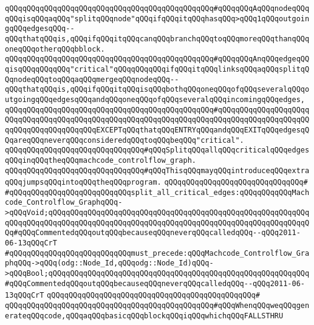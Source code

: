 \verb|qQQqqQQqqQQqqQQqqQQqqQQqqQQqqQQqqQQqqQQqqQQqqQQq#qQQqqQQqAqQQqnodeqQQqqQQqisqQQqaqQQq"splitqQQqnode"qQQqifqQQqitqQQqhasqQQq>qQQq1qQQqoutgoingqQQqedgesqQQq--qQQqthatqQQqis,qQQqifqQQqitqQQqcanqQQqbranchqQQqtoqQQqmoreqQQqthanqQQqoneqQQqotherqQQqbblock.|\newline
\verb|qQQqqQQqqQQqqQQqqQQqqQQqqQQqqQQqqQQqqQQqqQQqqQQq#qQQqqQQqAnqQQqedgeqQQqisqQQqqQQqqQQq"critical"qQQqqQQqqQQqifqQQqitqQQqlinksqQQqaqQQqsplitqQQqnodeqQQqtoqQQqaqQQqmergeqQQqnodeqQQq--qQQqthatqQQqis,qQQqifqQQqitqQQqisqQQqbothqQQqoneqQQqofqQQqseveralqQQqoutgoingqQQqedgesqQQqandqQQqoneqQQqofqQQqseveralqQQqincomingqQQqedges,|\newline
\verb|qQQqqQQqqQQqqQQqqQQqqQQqqQQqqQQqqQQqqQQqqQQqqQQq#qQQqqQQqqQQqqQQqqQQqqQQqqQQqqQQqqQQqqQQqqQQqqQQqqQQqqQQqqQQqqQQqqQQqqQQqqQQqqQQqqQQqqQQqqQQqqQQqqQQqqQQqqQQqqQQqEXCEPTqQQqthatqQQqENTRYqQQqandqQQqEXITqQQqedgesqQQqareqQQqneverqQQqconsideredqQQqtoqQQqbeqQQq"critical".|\newline
\newline
\newline
\verb|qQQqqQQqqQQqqQQqqQQqqQQqqQQqqQQq#qQQqSplitqQQqallqQQqcriticalqQQqedgesqQQqinqQQqtheqQQqmachcode_controlflow_graph.|\newline
\verb|qQQqqQQqqQQqqQQqqQQqqQQqqQQqqQQq#qQQqThisqQQqmayqQQqintroduceqQQqextraqQQqjumpsqQQqintoqQQqtheqQQqprogram.|\newline
\verb|qQQqqQQqqQQqqQQqqQQqqQQqqQQqqQQq#|\newline
\verb|#qQQqqQQqqQQqqQQqqQQqqQQqqQQqsplit_all_critical_edges:qQQqqQQqqQQqMachcode_Controlflow_GraphqQQq->qQQqVoid;qQQqqQQqqQQqqQQqqQQqqQQqqQQqqQQqqQQqqQQqqQQqqQQqqQQqqQQqqQQqqQQqqQQqqQQqqQQqqQQqqQQqqQQqqQQqqQQqqQQqqQQqqQQqqQQqqQQqqQQqqQQqqQQqqQQq#qQQqCommentedqQQqoutqQQqbecauseqQQqneverqQQqcalledqQQq--qQQq2011-06-13qQQqCrT|\newline
\newline
\newline
\verb|#qQQqqQQqqQQqqQQqqQQqqQQqqQQqmust_precede:qQQqMachcode_Controlflow_GraphqQQq->qQQq(odg::Node_Id,qQQqodg::Node_Id)qQQq->qQQqBool;qQQqqQQqqQQqqQQqqQQqqQQqqQQqqQQqqQQqqQQqqQQqqQQqqQQqqQQqqQQq#qQQqCommentedqQQqoutqQQqbecauseqQQqneverqQQqcalledqQQq--qQQq2011-06-13qQQqCrT|\newline
\verb|qQQqqQQqqQQqqQQqqQQqqQQqqQQqqQQqqQQqqQQqqQQqqQQq#|\newline
\verb|qQQqqQQqqQQqqQQqqQQqqQQqqQQqqQQqqQQqqQQqqQQqqQQq#qQQqWhenqQQqweqQQqgenerateqQQqcode,qQQqaqQQqbasicqQQqblockqQQqiqQQqwhichqQQqFALLSTHRU|\newline
